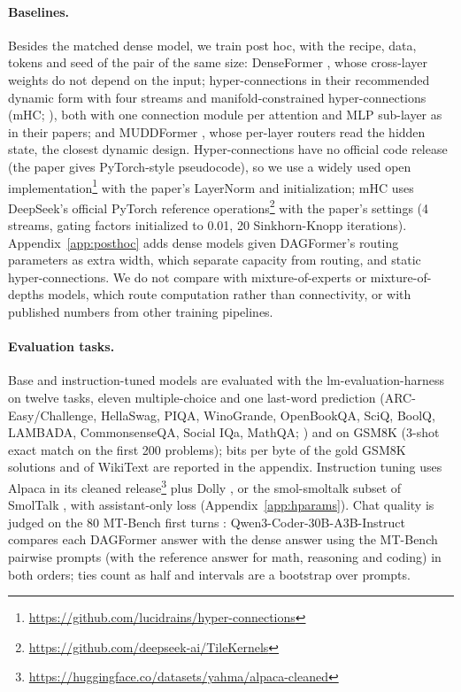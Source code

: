 \documentclass[11pt]{article}
\newcommand{\dagf}{DAGFormer}
\begin{document}
\paragraph{Baselines.} Besides the matched dense model, we train post hoc, with the recipe, data, tokens and seed of the pair of the same size: DenseFormer \citep{pagliardini2024denseformer}, whose cross-layer weights do not depend on the input; hyper-connections in their recommended dynamic form with four streams \citep{zhu2024hyperconnections} and manifold-constrained hyper-connections (mHC; \citealp{mhc2026}), both with one connection module per attention and MLP sub-layer as in their papers; and MUDDFormer \citep{muddformer2025}, whose per-layer routers read the hidden state, the closest dynamic design. Hyper-connections have no official code release (the paper gives PyTorch-style pseudocode), so we use a widely used open implementation\footnote{\url{https://github.com/lucidrains/hyper-connections}} with the paper's LayerNorm and initialization; mHC uses DeepSeek's official PyTorch reference operations\footnote{\url{https://github.com/deepseek-ai/TileKernels}} with the paper's settings (4 streams, gating factors initialized to 0.01, 20 Sinkhorn-Knopp iterations). Appendix~\ref{app:posthoc} adds dense models given \dagf{}'s routing parameters as extra width, which separate capacity from routing, and static hyper-connections. We do not compare with mixture-of-experts or mixture-of-depths models, which route computation rather than connectivity, or with published numbers from other training pipelines.

\paragraph{Evaluation tasks.} Base and instruction-tuned models are evaluated with the lm-evaluation-harness \citep{gao2024lmeval} on twelve tasks, eleven multiple-choice and one last-word prediction (ARC-Easy/Challenge, HellaSwag, PIQA, WinoGrande, OpenBookQA, SciQ, BoolQ, LAMBADA, CommonsenseQA, Social IQa, MathQA; \citealp{clark2018arc,zellers2019hellaswag,bisk2020piqa,sakaguchi2020winogrande,mihaylov2018openbookqa,welbl2017sciq,clark2019boolq,paperno2016lambada,talmor2019commonsenseqa,sap2019socialiqa,amini2019mathqa}) and on GSM8K (3-shot exact match on the first 200 problems); bits per byte of the gold GSM8K solutions and of WikiText are reported in the appendix. Instruction tuning uses Alpaca \citep{taori2023alpaca} in its cleaned release\footnote{\url{https://huggingface.co/datasets/yahma/alpaca-cleaned}} plus Dolly \citep{conover2023dolly}, or the smol-smoltalk subset of SmolTalk \citep{allal2025smollm2}, with assistant-only loss (Appendix~\ref{app:hparams}). Chat quality is judged on the 80 MT-Bench first turns \citep{zheng2023judge}: Qwen3-Coder-30B-A3B-Instruct \citep{qwen3,qwen3coder} compares each \dagf{} answer with the dense answer using the MT-Bench pairwise prompts (with the reference answer for math, reasoning and coding) in both orders; ties count as half and intervals are a bootstrap over prompts.
\end{document}
